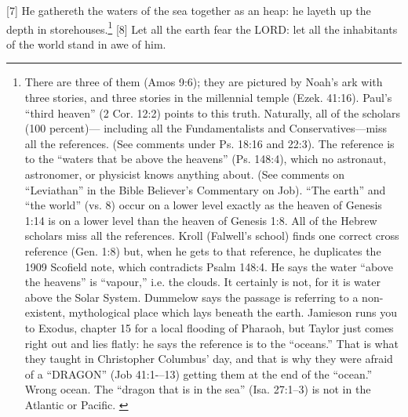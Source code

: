 [7] \textcolor[rgb]{0.00,0.00,1.00}{He gathereth the waters of the sea together as an heap: he layeth up the depth in storehouses.}\footnote{There are three of them (Amos 9:6); they are pictured by Noah’s ark with three stories, and three stories in the millennial temple (Ezek. 41:16). Paul’s “third heaven” (2 Cor. 12:2) points to this truth. Naturally, all of the scholars (100 percent)— including all the Fundamentalists and Conservatives—miss all the references. (See comments under Ps. 18:16 and 22:3). The reference is to the “waters that be above the heavens” (Ps. 148:4), which no astronaut, astronomer, or physicist knows anything about. (See comments on “Leviathan” in the Bible Believer’s Commentary on Job). “The earth” and “the world” (vs. 8) occur on a lower level exactly as the heaven of Genesis 1:14 is on a lower level than the heaven of Genesis 1:8. All of the Hebrew scholars miss all the references. Kroll (Falwell’s school) finds one correct cross reference (Gen. 1:8) but, when he gets to that reference, he duplicates the 1909 Scofield note, which contradicts Psalm 148:4. He says the water “above the heavens” is “vapour,” i.e. the clouds. It certainly is not, for it is water above the Solar System. Dummelow says the passage is referring to a non-existent, mythological place which lays beneath the earth. Jamieson runs you to Exodus, chapter 15 for a local flooding of Pharaoh, but Taylor just comes right out and lies flatly: he says the reference is to the “oceans.” That is what they taught in Christopher Columbus’ day, and that is why they were afraid of a “DRAGON” (Job 41:1-–13) getting them at the end of the “ocean.” Wrong ocean. The “dragon that is in the sea” (Isa. 27:1–3) is not in the Atlantic or Pacific. \cite{Ruckman1992Psalms} }
[8] \textcolor[rgb]{0.00,0.00,1.00}{Let all the earth fear the LORD: let all the inhabitants of the world stand in awe of him.}

